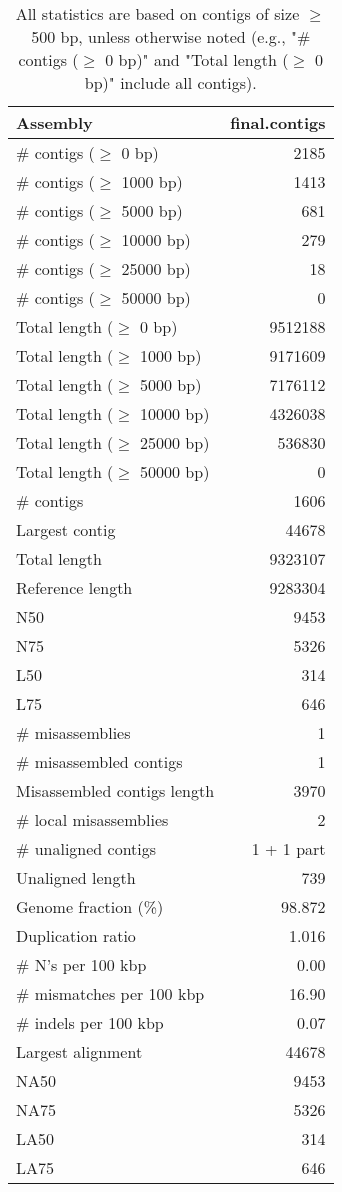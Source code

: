 \documentclass[12pt,a4paper]{article}
\begin{document}
\begin{table}[ht]
\begin{center}
\caption{All statistics are based on contigs of size $\geq$ 500 bp, unless otherwise noted (e.g., "\# contigs ($\geq$ 0 bp)" and "Total length ($\geq$ 0 bp)" include all contigs).}
\begin{tabular}{|l*{1}{|r}|}
\hline
Assembly & final.contigs \\ \hline
\# contigs ($\geq$ 0 bp) & 2185 \\ \hline
\# contigs ($\geq$ 1000 bp) & 1413 \\ \hline
\# contigs ($\geq$ 5000 bp) & 681 \\ \hline
\# contigs ($\geq$ 10000 bp) & 279 \\ \hline
\# contigs ($\geq$ 25000 bp) & 18 \\ \hline
\# contigs ($\geq$ 50000 bp) & 0 \\ \hline
Total length ($\geq$ 0 bp) & 9512188 \\ \hline
Total length ($\geq$ 1000 bp) & 9171609 \\ \hline
Total length ($\geq$ 5000 bp) & 7176112 \\ \hline
Total length ($\geq$ 10000 bp) & 4326038 \\ \hline
Total length ($\geq$ 25000 bp) & 536830 \\ \hline
Total length ($\geq$ 50000 bp) & 0 \\ \hline
\# contigs & 1606 \\ \hline
Largest contig & 44678 \\ \hline
Total length & 9323107 \\ \hline
Reference length & 9283304 \\ \hline
N50 & 9453 \\ \hline
N75 & 5326 \\ \hline
L50 & 314 \\ \hline
L75 & 646 \\ \hline
\# misassemblies & 1 \\ \hline
\# misassembled contigs & 1 \\ \hline
Misassembled contigs length & 3970 \\ \hline
\# local misassemblies & 2 \\ \hline
\# unaligned contigs & 1 + 1 part \\ \hline
Unaligned length & 739 \\ \hline
Genome fraction (\%) & 98.872 \\ \hline
Duplication ratio & 1.016 \\ \hline
\# N's per 100 kbp & 0.00 \\ \hline
\# mismatches per 100 kbp & 16.90 \\ \hline
\# indels per 100 kbp & 0.07 \\ \hline
Largest alignment & 44678 \\ \hline
NA50 & 9453 \\ \hline
NA75 & 5326 \\ \hline
LA50 & 314 \\ \hline
LA75 & 646 \\ \hline
\end{tabular}
\end{center}
\end{table}
\end{document}
